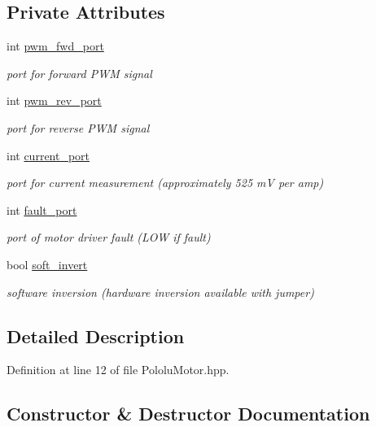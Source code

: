 \subsection*{Private Attributes}
\begin{DoxyCompactItemize}
\item 
int \hyperlink{class_pololu_motor_a0685d77c55b5ff024ca26b959e26285f}{pwm\+\_\+fwd\+\_\+port}
\begin{DoxyCompactList}\small\item\em port for forward P\+WM signal \end{DoxyCompactList}\item 
int \hyperlink{class_pololu_motor_a6ad3e14d6c3e1c8806bce32f794d5ec9}{pwm\+\_\+rev\+\_\+port}
\begin{DoxyCompactList}\small\item\em port for reverse P\+WM signal \end{DoxyCompactList}\item 
int \hyperlink{class_pololu_motor_a6b58fc42cb55c835b966f20092aee79b}{current\+\_\+port}
\begin{DoxyCompactList}\small\item\em port for current measurement (approximately 525 mV per amp) \end{DoxyCompactList}\item 
int \hyperlink{class_pololu_motor_aa1c771561c7c483216aec3415aa6ec9d}{fault\+\_\+port}
\begin{DoxyCompactList}\small\item\em port of motor driver fault (L\+OW if fault) \end{DoxyCompactList}\item 
bool \hyperlink{class_pololu_motor_af729e682597489cad35fd8a109ab9e5f}{soft\+\_\+invert}
\begin{DoxyCompactList}\small\item\em software inversion (hardware inversion available with jumper) \end{DoxyCompactList}\end{DoxyCompactItemize}


\subsection{Detailed Description}


Definition at line 12 of file Pololu\+Motor.\+hpp.



\subsection{Constructor \& Destructor Documentation}
\mbox{\label{class_pololu_motor_ac90c6552daaf283815ec7c8de8e8529d}} 
